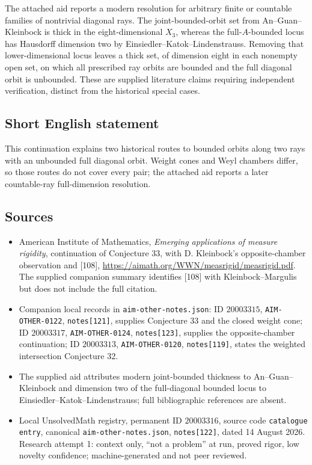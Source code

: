 \documentclass[11pt]{article}
\begin{document}
The attached aid reports a modern resolution for arbitrary finite or countable families of nontrivial diagonal rays. The joint-bounded-orbit set from An--Guan--Kleinbock is thick in the eight-dimensional $X_3$, whereas the full-$A$-bounded locus has Hausdorff dimension two by Einsiedler--Katok--Lindenstrauss. Removing that lower-dimensional locus leaves a thick set, of dimension eight in each nonempty open set, on which all prescribed ray orbits are bounded and the full diagonal orbit is unbounded. These are supplied literature claims requiring independent verification, distinct from the historical special cases.
\subsection{Short English statement}
This continuation explains two historical routes to bounded orbits along two rays with an unbounded full diagonal orbit. Weight cones and Weyl chambers differ, so those routes do not cover every pair; the attached aid reports a later countable-ray full-dimension resolution.
\subsection{Sources}
\begin{itemize}
\item American Institute of Mathematics, \emph{Emerging applications of measure rigidity}, continuation of Conjecture 33, with D. Kleinbock's opposite-chamber observation and [108], \url{https://aimath.org/WWN/measrigid/measrigid.pdf}. The supplied companion summary identifies [108] with Kleinbock--Margulis but does not include the full citation.
\item Companion local records in \texttt{aim-other-notes.json}: ID $20003315$, \texttt{AIM-OTHER-0122}, \texttt{notes[121]}, supplies Conjecture 33 and the closed weight cone; ID $20003317$, \texttt{AIM-OTHER-0124}, \texttt{notes[123]}, supplies the opposite-chamber continuation; ID $20003313$, \texttt{AIM-OTHER-0120}, \texttt{notes[119]}, states the weighted intersection Conjecture 32.
\item The supplied aid attributes modern joint-bounded thickness to An--Guan--Kleinbock and dimension two of the full-diagonal bounded locus to Einsiedler--Katok--Lindenstrauss; full bibliographic references are absent.
\item Local UnsolvedMath registry, permanent ID $20003316$, source code \texttt{catalogue entry}, canonical \texttt{aim-other-notes.json}, \texttt{notes[122]}, dated 14 August 2026. Research attempt 1: context only, ``not a problem'' at run, proved rigor, low novelty confidence; machine-generated and not peer reviewed.
\end{itemize}
\end{document}
